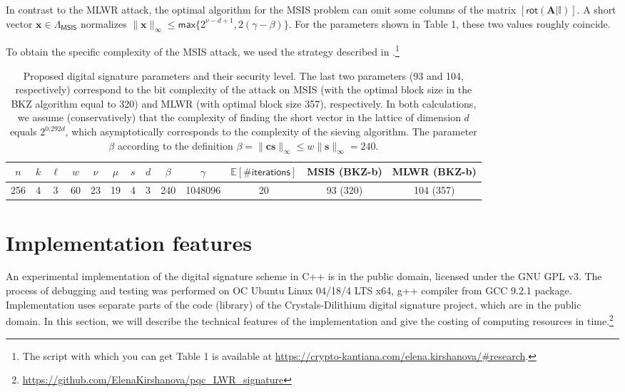 \documentclass{article}
\theoremstyle{plain}
\theoremstyle{definition}
\begin{document}
    In contrast to the MLWR attack, the optimal algorithm for the MSIS problem can omit some columns of the matrix $[\mathsf{rot}(\mathbf{A} | \mathbb{I})]$. A short vector $\mathbf{x} \in \varLambda_\mathsf{MSIS}$ normalizes $\|\mathbf{x}\|_\infty \leq \mathsf{max} \{2^{\nu - d + 1}, 2(\gamma - \beta)\}$. For the parameters shown in Table 1, these two values roughly coincide.
    
    To obtain the specific complexity of the MSIS attack, we used the strategy described in \cite[Appendix C]{DKL+18}.\footnote{The script with which you can get Table 1 is available at \url{https://crypto-kantiana.com/elena.kirshanova/\#research}.}

    \begin{table}[H]
    \begin{center}
    \begin{tabular}{ccccccccccccc}
        \hline
        $n$ & $k$ & $\ell$ & $w$ & $\nu$ & $\mu$ & $s$ & $d$ & $\beta$ & $\gamma$ & $\mathbb{E}[\mathsf{\#iterations}]$ & MSIS (BKZ-b) & MLWR (BKZ-b) \\
        \hline
        256 & 4 & 3 & 60 & 23 & 19 & 4 & 3 & 240 & 1048096 & 20 & 93 (320) & 104 (357)\\
        \hline
    \end{tabular}
    \end{center}
    \caption{\label{tab:Table 1} Proposed digital signature parameters and their security level. The last two parameters (93 and 104, respectively) correspond to the bit complexity of the attack on MSIS (with the optimal block size in the BKZ algorithm equal to 320) and MLWR (with optimal block size 357), respectively. In both calculations, we assume (conservatively) that the complexity of finding the short vector in the lattice of dimension $d$ equals $2^{0.292d}$, which asymptotically corresponds to the complexity of the sieving algorithm. The parameter $\beta$ according to the definition $\beta = \|\mathbf{cs}\|_\infty \leq w\|\mathbf{s}\|_\infty = 240$.}
    \end{table}

    \section{Implementation features}
    \label{sec:features}

    An experimental implementation of the digital signature scheme in C++ is in the public domain, licensed under the GNU GPL v3. The process of debugging and testing was performed on OC Ubuntu Linux 04/18/4 LTS x64, g++ compiler from GCC 9.2.1 package. Implementation uses separate parts of the code (library) of the Crystals-Dilithium digital signature project, which are in the public domain. In this section, we will describe the technical features of the implementation and give the costing of computing resources in time.\footnote{\url{https://github.com/ElenaKirshanova/pqc_LWR_signature}}
\end{document}

